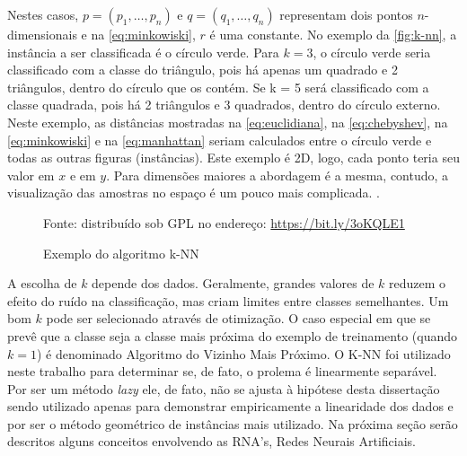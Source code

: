 Nestes casos, $ p = (p_1, \dots, p_n)$ e $ q = (q_1, \dots, q_n) $ representam dois pontos $n$-dimensionais e na \autoref{eq:minkowiski}, $r$ é uma constante. No exemplo da \autoref{fig:k-nn},  a instância a ser classificada é o círculo verde. Para $k = 3$, o círculo verde seria classificado com a classe do triângulo, pois há apenas um quadrado e 2 triângulos, dentro do círculo que os contém. Se k = 5 será classificado com a classe quadrada, pois há 2 triângulos e 3 quadrados, dentro do círculo externo. Neste exemplo, as distâncias mostradas na \autoref{eq:euclidiana}, na \autoref{eq:chebyshev}, na \autoref{eq:minkowiski} e na \autoref{eq:manhattan} seriam calculados entre o círculo verde e todas as outras figuras (instâncias). Este exemplo é 2D, logo, cada ponto teria seu valor em $x$ e em $y$. Para dimensões maiores a abordagem é a mesma, contudo, a visualização das amostras no espaço é um pouco mais complicada. \cite{Boscarioli2017, data_science_do_zero2016, goldschmidt2005}.

\begin{figure}[h!]
	\centering
	\caption{Exemplo do algoritmo k-NN}
	
	{\scriptsize Fonte: distribuído sob GPL no endereço: \href{https://bit.ly/3oKQLE1}{https://bit.ly/3oKQLE1} }
	\label{fig:k-nn}
\end{figure}

A escolha de $k$ depende dos dados. Geralmente, grandes valores de $k$ reduzem o efeito do ruído na classificação, mas criam limites entre classes semelhantes. Um bom $k$ pode ser selecionado através de otimização. O caso especial em que se prevê que a classe seja a classe mais próxima do exemplo de treinamento (quando  $k = 1$) é denominado Algoritmo do Vizinho Mais Próximo. O K-NN foi utilizado neste trabalho para determinar se, de fato, o prolema é linearmente separável. Por ser um método \textit{lazy} ele, de fato, não se ajusta à hipótese desta dissertação sendo utilizado apenas para demonstrar empiricamente a linearidade dos dados e por ser o método geométrico de instâncias mais utilizado. Na próxima seção serão descritos alguns conceitos envolvendo as RNA's, Redes Neurais Artificiais.

